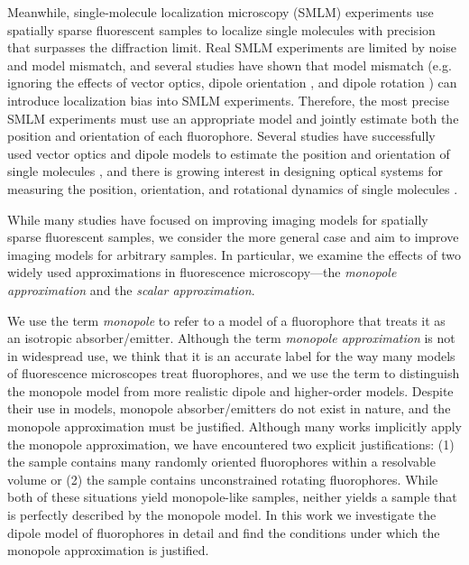 \documentclass[]{osa-article}
\begin{document}
Meanwhile, single-molecule localization microscopy (SMLM) experiments use
spatially sparse fluorescent samples to localize single molecules with precision
that surpasses the diffraction limit. Real SMLM experiments are limited by noise
\cite{foreman2011, chao2016} and model mismatch, and several studies have shown
that model mismatch (e.g. ignoring the effects of vector optics, dipole
orientation \cite{backlund2014}, and dipole rotation \cite{lew2013}) can
introduce localization bias into SMLM experiments. Therefore, the most precise
SMLM experiments must use an appropriate model and jointly estimate both the
position and orientation of each fluorophore. Several studies have successfully
used vector optics and dipole models to estimate the position and orientation of
single molecules \cite{bohmer2003, lieb2004, toprak2006, aguet2009}, and there
is growing interest in designing optical systems for measuring the position,
orientation, and rotational dynamics of single molecules \cite{agrawal2012,
  backer2014, zhang2018, zhang2018-2}.

While many studies have focused on improving imaging models for spatially sparse
fluorescent samples, we consider the more general case and aim to improve
imaging models for arbitrary samples. In particular, we examine the effects of
two widely used approximations in fluorescence microscopy---the \textit{monopole
  approximation} and the \textit{scalar approximation}.

We use the term \textit{monopole} to refer to a model of a fluorophore that
treats it as an isotropic absorber/emitter. Although the term \textit{monopole
  approximation} is not in widespread use, we think that it is an accurate label
for the way many models of fluorescence microscopes treat fluorophores, and we
use the term to distinguish the monopole model from more realistic dipole and
higher-order models. Despite their use in models, monopole absorber/emitters do
not exist in nature, and the monopole approximation must be justified. Although
many works implicitly apply the monopole approximation, we have encountered two
explicit justifications: (1) the sample contains many randomly oriented
fluorophores within a resolvable volume or (2) the sample contains unconstrained
rotating fluorophores. While both of these situations yield monopole-like
samples, neither yields a sample that is perfectly described by the monopole
model. In this work we investigate the dipole model of fluorophores in detail
and find the conditions under which the monopole approximation is justified.
\end{document}
